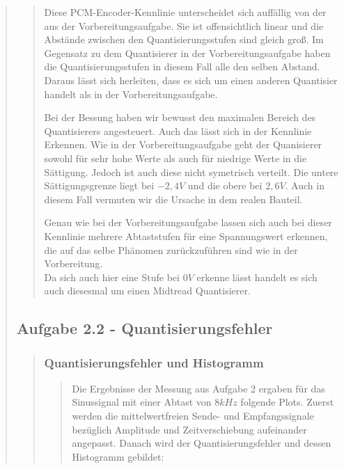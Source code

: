 \begin{quote}
\begin{quote}
        Diese PCM-Encoder-Kennlinie unterscheidet sich auffällig von der aus der Vorbereitungsaufgabe.
        Sie ist offensichtlich linear und die Abstände zwischen den Quantisierungsstufen sind gleich groß. Im Gegensatz
        zu dem Quantisierer in der Vorbereitungsaufgabe haben die Quantisierungsstufen in diesem Fall alle den selben
        Abstand. Daraus lässt sich herleiten, dass es sich um einen anderen Quantisier handelt als in der
        Vorbereitungsaufgabe.\vspace{1em}
        
        Bei der Bessung haben wir bewusst den maximalen Bereich des Quantisierers angesteuert. Auch das lässt sich in
        der Kennlinie Erkennen. Wie in der Vorbereitungsaufgabe geht der Quanisierer sowohl für sehr hohe Werte als auch
        für niedrige Werte in die Sättigung. Jedoch ist auch diese nicht symetrisch verteilt. Die untere
        Sättigungsgrenze liegt bei $-2,4 V$ und die obere bei $2,6 V$. Auch in diesem Fall vermuten wir die Ursache in
        dem realen Bauteil.\vspace{1em}
        
        Genau wie bei der Vorbereitungsaufgabe lassen sich auch bei dieser Kennlinie mehrere Abtaststufen für eine
        Spannungswert erkennen, die auf das selbe Phänomen zurückzuführen sind wie in der Vorbereitung.\\
        Da sich auch hier eine Stufe bei $0 V$ erkenne lässt handelt es sich auch diesesmal um einen Midtread
        Quantisierer.\vspace{1em}
        
        
    \end{quote}  %
    
    \subsection{Aufgabe 2.2 - Quantisierungsfehler}
    \begin{quote}
    
        \subsubsection{Quantisierungsfehler und Histogramm}
        \begin{quote}
    
            Die Ergebnisse der Messung aus Aufgabe 2 ergaben für das Sinussignal mit
            einer Abtast von $8 kHz$ folgende Plots. Zuerst werden die
            mittelwertfreien Sende- und Empfangssignale bezüglich Amplitude und
            Zeitverschiebung aufeinander angepasst. Danach wird der
            Quantisierungsfehler und dessen Histogramm gebildet:
            

\end{quote}
\end{quote}
\end{quote}

